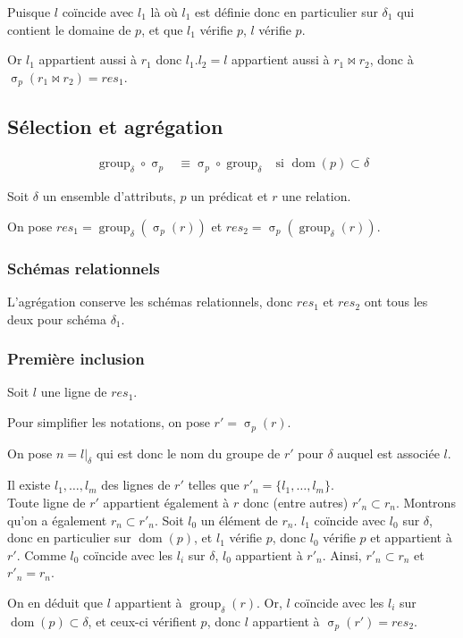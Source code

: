 \documentclass[french]{article}
\DeclareMathOperator{\sel}{\sigma}
\DeclareMathOperator{\group}{group}
\DeclareMathOperator{\dom}{dom}
\newcommand{\selP}{\sel_p}
\newcommand{\groupDelta}{\group_{\delta}}
\begin{document}
Puisque $l$ coïncide avec $l_1$ là où $l_1$ est définie
donc en particulier sur $\delta_1$ qui contient le domaine de $p$,
et que $l_1$ vérifie $p$, $l$ vérifie $p$.

Or $l_1$ appartient aussi à $r_1$ donc $l_1 . l_2 = l$
appartient aussi à $r_1 \Join r_2$, donc à $\selP(r_1 \Join r_2) = res_1$.

\subsection*{Sélection et agrégation}
\begin{align}
\groupDelta \circ \selP 
& \equiv \selP \circ \groupDelta
& \text{si $\dom(p) \subset \delta$}
\end{align}

Soit $\delta$ un ensemble d'attributs,
$p$ un prédicat et
$r$ une relation.

On pose $res_1 = \groupDelta(\selP(r))$
et $res_2  = \selP(\groupDelta(r))$.

\subsubsection*{Schémas relationnels}
L'agrégation conserve les schémas relationnels,
donc $res_1$ et $res_2$ ont tous les deux pour schéma
$\delta_1$.

\subsubsection*{Première inclusion}
Soit $l$ une ligne de $res_1$.

Pour simplifier les notations, on pose
$r' = \selP(r)$.

On pose $n = l|_\delta$ qui est donc
le nom du groupe de $r'$ pour 
$\delta$ auquel est associée $l$.

Il existe $l_1, \dots, l_m$ des lignes
de $r'$ telles que $r'_n = \{l_1, \dots , l_m\}$. \\

Toute ligne de $r'$ appartient également à $r$
donc (entre autres) $r'_n \subset r_n$.
Montrons qu'on a également $r_n \subset r'_n$.
Soit $l_0$ un élément de $r_n$.
$l_1$ coïncide avec $l_0$ sur $\delta$,
donc en particulier sur $\dom(p)$,
et $l_1$ vérifie $p$,
donc $l_0$ vérifie $p$ et appartient à $r'$.
Comme $l_0$ coïncide avec les $l_i$ sur $\delta$,
$l_0$ appartient à $r'_n$.
Ainsi, $r'_n \subset r_n$ et $r'_n = r_n$.

On en déduit que $l$ appartient à $\groupDelta(r)$.
Or, $l$ coïncide avec les $l_i$ sur $\dom(p) \subset \delta$,
et ceux-ci vérifient $p$, donc
$l$ appartient à $\selP(r') = res_2$.
\end{document}
